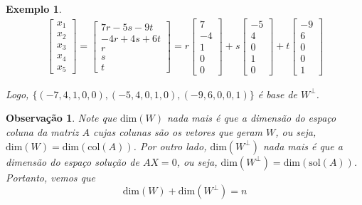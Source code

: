 \documentclass{article}
\newtheorem*{remark}{Observação}
\newtheorem*{example}{Exemplo}
\begin{document}
\begin{example}
	\begin{align*}
	\begin{bmatrix}
	x_1\\
	x_2 \\
	x_3 \\
	x_4 \\
	x_5 
	\end{bmatrix} = \begin{bmatrix}
	7r - 5s - 9t \\
	-4r + 4s + 6t \\
	r \\
	s \\
	t
	\end{bmatrix} = r\begin{bmatrix}
	7\\
	-4\\
	1\\
	0\\
	0
	\end{bmatrix} + s\begin{bmatrix}
	-5\\
	4\\
	0\\
	1\\
	0
	\end{bmatrix} + t\begin{bmatrix}
	-9\\
	6\\
	0\\
	0\\
	1
	\end{bmatrix}
	\end{align*} 
	
	\par\vspace{0.3cm} Logo, $\{(-7,4,1,0,0), (-5,4,0,1,0), (-9,6,0,0,1)\}$ é base de $W^{\perp}$.
	
\end{example}

\begin{remark}
	Note que $\text{dim}(W)$ nada mais é que a dimensão do espaço coluna da matriz $A$ cujas colunas são os vetores que geram $W$, ou seja, $\text{dim}(W) = \text{dim}(\text{col}(A))$. Por outro lado, $\text{dim}(W^{\perp})$ nada mais é que a dimensão do espaço solução de $AX = 0$, ou seja, $\text{dim}(W^{\perp}) = \text{dim}(\text{sol}(A))$. Portanto, vemos que 
	\begin{equation*}
	\text{dim}(W) + \text{dim}(W^{\perp}) = n
	\end{equation*}
\end{remark}
\end{document}
